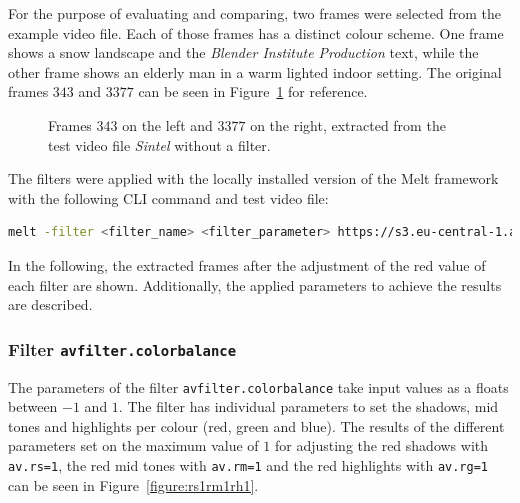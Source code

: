 \documentclass[../MasterThesis.tex]{subfiles}
\begin{document}
For the purpose of evaluating and comparing, two frames were selected from the example video file. Each of those frames has a distinct colour scheme. One frame shows a snow landscape and the \textit{Blender Institute Production} text, while the other frame shows an elderly man in a warm lighted indoor setting. The original frames $343$ and $3377$ can be seen in Figure~\ref{figure:nofilter} for reference.


\begin{figure}[H]
	\begin{center}
		\caption[Frames $343$ and $3377$ from the test video file without a filter.]{Frames $343$ on the left and $3377$ on the right, extracted from the test video file \textit{Sintel} without a filter.}
		\label{figure:nofilter}
	\end{center}
\end{figure}



The filters were applied with the locally installed version of the Melt framework with the following CLI command and test video file:
\begin{lstlisting}[language=bash, numbers=none]
	melt -filter <filter_name> <filter_parameter> https://s3.eu-central-1.amazonaws.com/accurate-player-demo-assets/timecode/sintel-2048-timecode-stereo.mp4 -consumer xgl
\end{lstlisting}


In the following, the extracted frames after the adjustment of the red value of each filter are shown. Additionally, the applied parameters to achieve the results are described.













\subsubsection*{Filter \texttt{avfilter.colorbalance}}

The parameters of the filter \texttt{avfilter.colorbalance} take input values as a floats between $-1$ and $1$. The filter has individual parameters to set the shadows, mid tones and highlights per colour (red, green and blue). The results of the different parameters set on the maximum value of $1$ for adjusting the red shadows with \texttt{av.rs=1}, the red mid tones with \texttt{av.rm=1} and the red highlights with \texttt{av.rg=1} can be seen in Figure~\ref{figure:rs1rm1rh1}.
\end{document}

